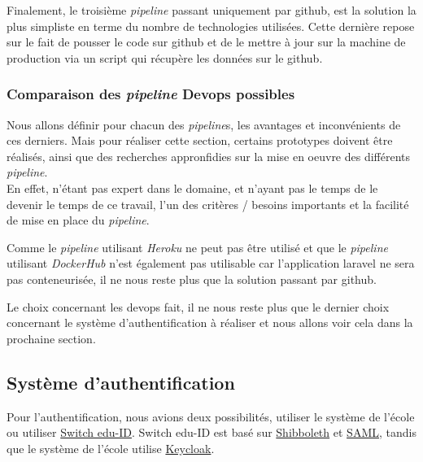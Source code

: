 \documentclass[
    iai, %
    il, %
]{heig-tb}
\begin{document}
Finalement, le troisième \emph{pipeline} passant uniquement par \Gls{github}, est la solution la plus simpliste en terme du nombre de technologies utilisées. Cette dernière repose sur le fait de pousser le code sur \Gls{github} et de le mettre à jour sur la machine de production via un script qui récupère les données sur le \Gls{github}.

\subsubsection{Comparaison des \emph{pipeline} Devops possibles}
Nous allons définir pour chacun des \emph{pipeline}s, les avantages et inconvénients de ces derniers.
Mais pour réaliser cette section, certains prototypes doivent être réalisés, ainsi que des recherches appronfidies sur la mise en oeuvre des différents \emph{pipeline}.\\
En effet, n'étant pas expert dans le domaine, et n'ayant pas le temps de le devenir le temps de ce travail, l'un des critères / besoins importants et la facilité de mise en place du \emph{pipeline}.

Comme le \emph{pipeline} utilisant \emph{Heroku} ne peut pas être utilisé et que le \emph{pipeline} utilisant \emph{DockerHub} n'est également pas utilisable car l'application \Gls{laravel} ne sera pas conteneurisée, il ne nous reste plus que la solution passant par \Gls{github}.



Le choix concernant les \Gls{devops} fait, il ne nous reste plus que le dernier choix concernant le système d'authentification à réaliser et nous allons voir cela dans la prochaine section.

\subsection{Système d'authentification}
Pour l'authentification, nous avions deux possibilités, utiliser le système de l'école ou utiliser \href{https://www.switch.ch/edu-id/}{Switch edu-ID}. Switch edu-ID est basé sur \href{https://www.switch.ch/aai/about/shibboleth/}{Shibboleth} et \href{https://support.google.com/a/answer/6262987?hl=fr}{SAML}, tandis que le système de l'école utilise \href{https://www.keycloak.org/}{Keycloak}.
\end{document}
